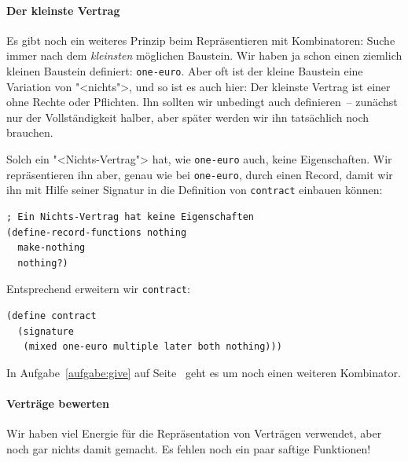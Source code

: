 \paragraph{Der kleinste Vertrag}

Es gibt noch ein weiteres Prinzip beim Repräsentieren mit
Kombinatoren: Suche immer nach dem \emph{kleinsten} möglichen
Baustein.  Wir haben ja schon einen ziemlich kleinen Baustein
definiert: \lstinline{one-euro}.  Aber oft ist der kleine Baustein
eine Variation von "<nichts">, und so ist es auch hier: Der kleinste
Vertrag ist einer ohne Rechte oder Pflichten.  Ihn sollten wir
unbedingt auch definieren~-- zunächst nur der Vollständigkeit halber,
aber später werden wir ihn tatsächlich noch brauchen.

Solch ein "<Nichts-Vertrag"> hat, wie \lstinline{one-euro} auch, keine
Eigenschaften.  Wir repräsentieren ihn aber, genau wie bei
\lstinline{one-euro}, durch einen Record, damit wir ihn mit Hilfe
seiner Signatur in die Definition von \lstinline{contract} einbauen
können:
%
\begin{lstlisting}
; Ein Nichts-Vertrag hat keine Eigenschaften
(define-record-functions nothing
  make-nothing
  nothing?)
\end{lstlisting}
%
Entsprechend erweitern wir \lstinline{contract}:
%
\begin{lstlisting}
(define contract
  (signature
   (mixed one-euro multiple later both nothing)))
\end{lstlisting}
%
In Aufgabe~\ref{aufgabe:give} auf Seite~\pageref{aufgabe:give} geht es
um noch einen weiteren Kombinator.

\paragraph{Verträge bewerten}

Wir haben viel Energie für die Repräsentation von Verträgen verwendet,
aber noch gar nichts damit gemacht.  Es fehlen noch ein paar saftige
Funktionen!

